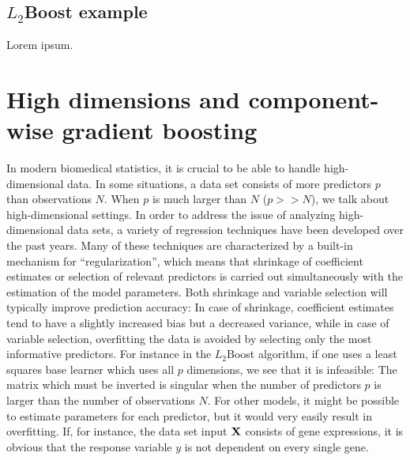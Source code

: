 \subsection{$L_2$Boost example}
Lorem ipsum.

\section{High dimensions and component-wise gradient boosting}\label{sec:component}
In modern biomedical statistics, it is crucial to be able to handle high-dimensional data. In some situations, a data set consists of more predictors $p$ than observations $N$. When $p$ is much larger than $N$ ($p>>N$), we talk about high-dimensional settings. In order to address the issue of analyzing high-dimensional data sets, a variety of regression techniques have been developed over the past years. Many of these techniques are characterized by a built-in mechanism for ``regularization'', which means that shrinkage of coefficient estimates or selection of relevant predictors is carried out simultaneously with the estimation of the model parameters. Both shrinkage and variable selection will typically improve prediction accuracy: In case of shrinkage, coefficient estimates tend to have a slightly increased bias but a decreased variance, while in case of variable selection, overfitting the data is avoided by selecting only the most informative predictors. For instance in the $L_2$Boost algorithm, if one uses a least squares base learner which uses all $p$ dimensions, we see that it is infeasible: The matrix which must be inverted is singular when the number of predictors $p$ is larger than the number of observations $N$. For other models, it might be possible to estimate parameters for each predictor, but it would very easily result in overfitting. If, for instance, the data set input $\mathbf{X}$ consists of gene expressions, it is obvious that the response variable $y$ is not dependent on every single gene.

